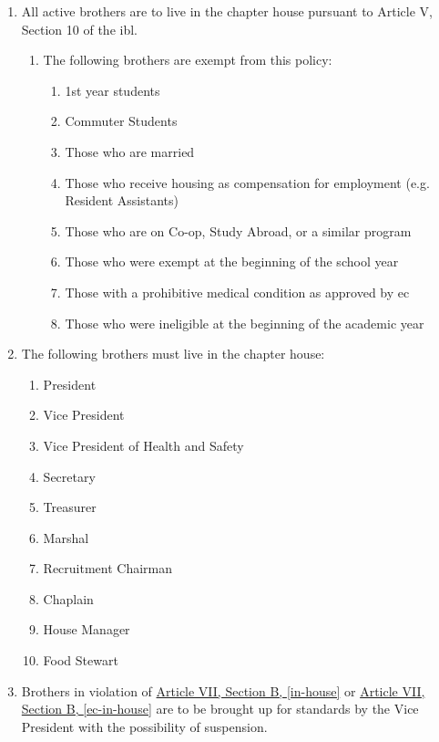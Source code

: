 	\begin{enumerate}
		\item All active brothers are to live in the chapter house pursuant to Article V, Section 10 of the \gls{ibl}.\label{in-house}
			\begin{enumerate}
				\item The following brothers are exempt from this policy:
					
					\begin{enumerate}
						\item 1st year students
						\item Commuter Students
						\item Those who are married
						\item Those who receive housing as compensation for employment (e.g. Resident Assistants)
						\item Those who are on Co-op, Study Abroad, or a similar program
						\item Those who were exempt at the beginning of the school year
                        \item Those with a prohibitive medical condition as approved by \gls{ec}
                        \item Those who were ineligible at the beginning of the academic year 
					\end{enumerate}
			\end{enumerate}

		\item The following brothers must live in the chapter house: \label{ec-in-house}
			\begin{enumerate}
				\item President
				\item Vice President
				\item Vice President of Health and Safety
				\item Secretary
				\item Treasurer
				\item Marshal
				\item Recruitment Chairman
				\item Chaplain
				\item House Manager
				\item Food Stewart
			\end{enumerate}

		\item Brothers in violation of \hyperref[in-house]{Article VII, Section B, \autoref*{in-house}} or \hyperref[ec-in-house]{Article VII, Section B, \autoref*{ec-in-house}} are to be brought up for standards by the Vice President with the possibility of suspension.


\end{enumerate}
